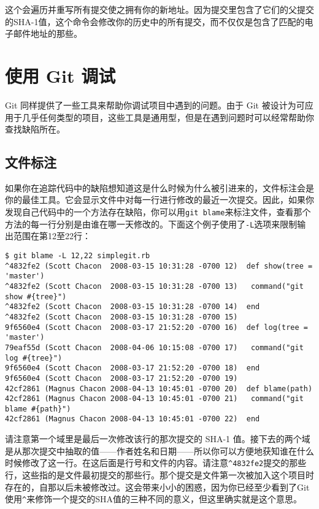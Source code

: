 \documentclass[a4paper]{book}
\begin{document}
这个会遍历并重写所有提交使之拥有你的新地址。因为提交里包含了它们的父提交的SHA-1值，这个命令会修改你的历史中的所有提交，而不仅仅是包含了匹配的电子邮件地址的那些。

\section{使用 Git 调试}

Git 同样提供了一些工具来帮助你调试项目中遇到的问题。由于 Git 被设计为可应用于几乎任何类型的项目，这些工具是通用型，但是在遇到问题时可以经常帮助你查找缺陷所在。

\subsection{文件标注}

如果你在追踪代码中的缺陷想知道这是什么时候为什么被引进来的，文件标注会是你的最佳工具。它会显示文件中对每一行进行修改的最近一次提交。因此，如果你发现自己代码中的一个方法存在缺陷，你可以用\texttt{git blame}来标注文件，查看那个方法的每一行分别是由谁在哪一天修改的。下面这个例子使用了\texttt{-L}选项来限制输出范围在第12至22行：

\begin{shaded}\begin{verbatim}
$ git blame -L 12,22 simplegit.rb 
^4832fe2 (Scott Chacon  2008-03-15 10:31:28 -0700 12)  def show(tree = 'master')
^4832fe2 (Scott Chacon  2008-03-15 10:31:28 -0700 13)   command("git show #{tree}")
^4832fe2 (Scott Chacon  2008-03-15 10:31:28 -0700 14)  end
^4832fe2 (Scott Chacon  2008-03-15 10:31:28 -0700 15)
9f6560e4 (Scott Chacon  2008-03-17 21:52:20 -0700 16)  def log(tree = 'master')
79eaf55d (Scott Chacon  2008-04-06 10:15:08 -0700 17)   command("git log #{tree}")
9f6560e4 (Scott Chacon  2008-03-17 21:52:20 -0700 18)  end
9f6560e4 (Scott Chacon  2008-03-17 21:52:20 -0700 19) 
42cf2861 (Magnus Chacon 2008-04-13 10:45:01 -0700 20)  def blame(path)
42cf2861 (Magnus Chacon 2008-04-13 10:45:01 -0700 21)   command("git blame #{path}")
42cf2861 (Magnus Chacon 2008-04-13 10:45:01 -0700 22)  end
\end{verbatim}\end{shaded}

请注意第一个域里是最后一次修改该行的那次提交的 SHA-1 值。接下去的两个域是从那次提交中抽取的值------作者姓名和日期------所以你可以方便地获知谁在什么时候修改了这一行。在这后面是行号和文件的内容。请注意\texttt{\^{}4832fe2}提交的那些行，这些指的是文件最初提交的那些行。那个提交是文件第一次被加入这个项目时存在的，自那以后未被修改过。这会带来小小的困惑，因为你已经至少看到了Git使用\texttt{\^{}}来修饰一个提交的SHA值的三种不同的意义，但这里确实就是这个意思。
\end{document}
